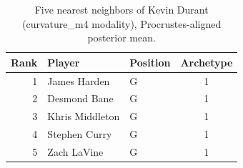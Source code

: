 \begin{table}[htbp]
  \centering\small
  \begin{tabular}{rllc}
    \toprule
    Rank & Player & Position & Archetype \\
    \midrule
    1 & James Harden & G & 1 \\
    2 & Desmond Bane & G & 1 \\
    3 & Khris Middleton & G & 1 \\
    4 & Stephen Curry & G & 1 \\
    5 & Zach LaVine & G & 1 \\
    \bottomrule
  \end{tabular}
  \caption{Five nearest neighbors of Kevin Durant (curvature_m4 modality), Procrustes-aligned posterior mean.}
  \label{tab:Kevin_Durant_neighbors_curvature_m4}
\end{table}

